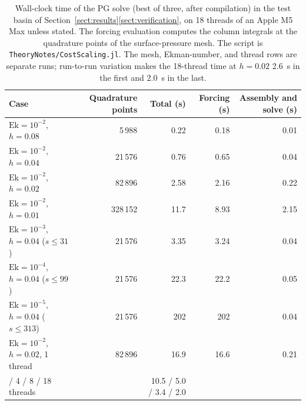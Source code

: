 \documentclass{ametsocV6.2}
\begin{document}
\begin{table}
\centering
\begin{tabular}{lrrrr}
\hline
Case & Quadrature points & Total (s) & Forcing (s) & Assembly and solve (s) \\
\hline
$\mathrm{Ek} = 10^{-2}$, $h = 0.08$ & 5\,988 & 0.22 & 0.18 & 0.01 \\
$\mathrm{Ek} = 10^{-2}$, $h = 0.04$ & 21\,576 & 0.76 & 0.65 & 0.04 \\
$\mathrm{Ek} = 10^{-2}$, $h = 0.02$ & 82\,896 & 2.58 & 2.16 & 0.22 \\
$\mathrm{Ek} = 10^{-2}$, $h = 0.01$ & 328\,152 & 11.7 & 8.93 & 2.15 \\
\hline
$\mathrm{Ek} = 10^{-3}$, $h = 0.04$ ($s \le 31$) & 21\,576 & 3.35 & 3.24 & 0.04 \\
$\mathrm{Ek} = 10^{-4}$, $h = 0.04$ ($s \le 99$) & 21\,576 & 22.3 & 22.2 & 0.05 \\
$\mathrm{Ek} = 10^{-5}$, $h = 0.04$ ($s \le 313$) & 21\,576 & 202 & 202 & 0.04 \\
\hline
$\mathrm{Ek} = 10^{-2}$, $h = 0.02$, 1 thread & 82\,896 & 16.9 & 16.6 & 0.21 \\
\quad 2 / 4 / 8 / 18 threads & & 10.5 / 5.0 / 3.4 / 2.0 & & \\
\hline
\end{tabular}
\vspace{6pt}
\caption{\label{tab:cost_scaling} Wall-clock time of the PG solve (best of three, after compilation) in the test basin of Section~\ref{sect:results}\ref{sect:verification}, on 18 threads of an Apple M5 Max unless stated. The forcing evaluation computes the column integrals at the quadrature points of the surface-pressure mesh. The script is \texttt{TheoryNotes/CostScaling.jl}. The mesh, Ekman-number, and thread rows are separate runs; run-to-run variation makes the 18-thread time at $h = 0.02$ 2.6~s in the first and 2.0~s in the last.}
\end{table}
\end{document}
